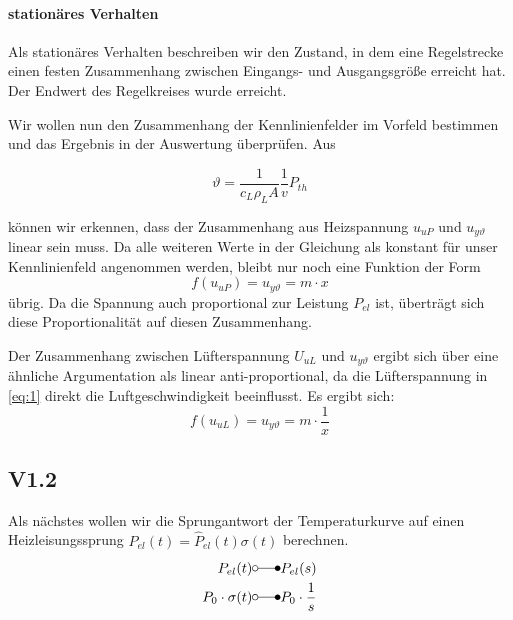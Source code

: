 \documentclass{report}
\begin{document}
\paragraph{stationäres Verhalten} Als stationäres Verhalten beschreiben wir den Zustand, in dem eine Regelstrecke einen festen Zusammenhang zwischen Eingangs- und Ausgangsgröße erreicht hat. Der Endwert des Regelkreises wurde erreicht.


\vspace{1em}
\noindent
Wir wollen nun den Zusammenhang der Kennlinienfelder im Vorfeld bestimmen und das Ergebnis in der Auswertung überprüfen. Aus

\begin{equation}
  \label{eq:1}
  \vartheta = \frac{1}{c_{L}\rho_{L}A}\frac{1}{v}P_{th}
\end{equation}

können wir erkennen, dass der Zusammenhang aus Heizspannung $u_{uP}$ und $u_{y\vartheta}$ linear sein muss. Da alle weiteren Werte in der Gleichung als konstant für unser Kennlinienfeld angenommen werden, bleibt nur noch eine Funktion der Form
\begin{equation}
  \label{eq:2}
  f(u_{uP}) = u_{y\vartheta} = m\cdot x
\end{equation}
übrig. Da die Spannung auch proportional zur Leistung $P_{el}$ ist, überträgt sich diese Proportionalität auf diesen Zusammenhang.

Der Zusammenhang zwischen Lüfterspannung $U_{uL}$ und $u_{y\vartheta}$ ergibt sich über eine ähnliche Argumentation als linear anti-proportional, da die Lüfterspannung in \ref{eq:1} direkt die Luftgeschwindigkeit beeinflusst. Es ergibt sich:
\begin{equation}
  \label{eq:3}
  f(u_{uL}) = u_{y\vartheta} = m\cdot \frac{1}{x}
\end{equation}

\subsection{V1.2}

Als nächstes wollen wir die Sprungantwort der Temperaturkurve auf einen Heizleisungssprung $P_{el}(t) = \hat{P}_{el}(t)\sigma(t)$ berechnen.
\begin{align}
  P_{el}(t) &\laplace P_{el}(s)\\
  P_{0}\cdot \sigma(t) &\laplace P_{0}\cdot \frac{1}{s}\\
\end{align}
\end{document}
